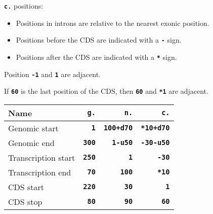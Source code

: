 \documentclass[a4, portrait]{seminar}
\newcommand{\bt}[1]{\texttt{\textbf{#1}}}
\begin{document}
\begin{slide}

  \positionpicture

  \bt{c.} positions:
  \begin{itemize}
    \item Positions in introns are relative to the nearest exonic position.
    \item Positions before the CDS are indicated with a \bt{-} sign.
    \item Positions after the CDS are indicated with a \bt{*} sign.
  \end{itemize}

  Position \bt{-1} and \bt{1} are adjacent.

  If \bt{60} is the last position of the CDS, then \bt{60} and \bt{*1} are
  adjacent.
  \vfill
\end{slide}

\begin{slide}

  \positionpicture

  \renewcommand{\arraystretch}{1}
  \begin{center}
    \begin{tabular}{l|r|r|r}
      Name                              & \bt{g.}  & \bt{n.}      & \bt{c.} \\
      \hline
      {\scriptsize Genomic start}       & \bt{1}   & \bt{100+d70} & 
        \bt{*10+d70} \\
      {\scriptsize Genomic end}         & \bt{300} & \bt{1-u50}   & 
        \bt{-30-u50} \\
      {\scriptsize Transcription start} & \bt{250} & \bt{1}       & \bt{-30} \\
      {\scriptsize Transcription end}   & \bt{70}  & \bt{100}     & \bt{*10} \\
      {\scriptsize CDS start}           & \bt{220} & \bt{30}      & \bt{1} \\
      {\scriptsize CDS stop}            & \bt{80}  & \bt{90}      & \bt{60} \\
    \end{tabular}
  \end{center}
  \vfill
\end{slide}
\end{document}
